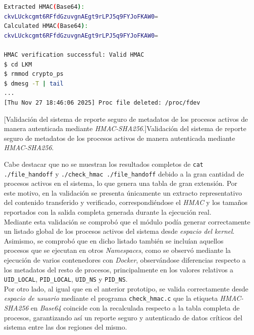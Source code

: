 \begin{lstlisting}[language=bash,basicstyle=\ttfamily\fontsize{5.6pt}{6.2pt}\selectfont,breaklines=false,columns=fullflexible,keepspaces=true]
Extracted HMAC(Base64):
ckvLUckcgmt6RFfdGzuvgnAEgt9rLPJ5q9FYJoFKAW0=
Calculated HMAC(Base64):
ckvLUckcgmt6RFfdGzuvgnAEgt9rLPJ5q9FYJoFKAW0=

HMAC verification successful: Valid HMAC
$ cd LKM
$ rmmod crypto_ps
$ dmesg -T | tail
...
[Thu Nov 27 18:46:06 2025] Proc file deleted: /proc/fdev
\end{lstlisting}
\captionsetup{type=code,justification=centering,singlelinecheck=false}
[Validación del sistema de reporte seguro de metadatos de los procesos activos de manera autenticada mediante \textit{HMAC-SHA256}.]{Validación del sistema de reporte seguro de metadatos de los procesos activos de manera autenticada mediante \textit{HMAC-SHA256}.}
\label{cod:report_validation}
\vspace{\baselineskip}

Cabe destacar que no se muestran los resultados completos de \verb|cat ./file_handoff| y \verb|./check_hmac ./file_handoff| debido a la gran cantidad de procesos activos en el sistema, lo que genera una tabla de gran extensión.
Por este motivo, en la validación se presenta únicamente un extracto representativo del contenido transferido y verificado, correspondiéndose el \textit{HMAC} y los tamaños reportados con la salida completa generada durante la ejecución real.\\

Mediante esta validación se comprobó que el módulo podía generar correctamente un listado global de los procesos activos del sistema desde \textit{espacio del kernel}.
Asimismo, se comprobó que en dicho listado también se incluían aquellos procesos que se ejecutan en otros \textit{Namespaces}, como se observó mediante la ejecución de varios contenedores con \textit{Docker}, observándose diferencias respecto a los metadatos del resto de procesos, principalmente en los valores relativos a \verb|UID_LOCAL|, \verb|PID_LOCAL|, \verb|UID_NS| y \verb|PID_NS|.\\

Por otro lado, al igual que en el anterior prototipo, se valida correctamente desde \textit{espacio de usuario} mediante el programa \verb|check_hmac.c| que la etiqueta \textit{HMAC-SHA256} en \textit{Base64} coincide con la recalculada respecto a la tabla completa de procesos, garantizando así un reporte seguro y autenticado de datos críticos del sistema entre las dos regiones del mismo.\\
